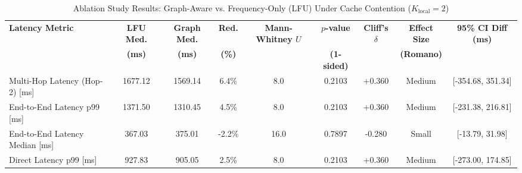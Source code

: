 \begin{table}[t]
\centering
\small
\caption{Ablation Study Results: Graph-Aware vs. Frequency-Only (LFU) Under Cache Contention ($K_{\text{local}} = 2$)}
\label{tab:ablation-graph-vs-lfu}
\begin{tabular}{lcccccccc}
\hline
\textbf{Latency Metric} & \textbf{LFU Med.} & \textbf{Graph Med.} & \textbf{Red.} & \textbf{Mann-Whitney $U$} & \textbf{$p$-value} & \textbf{Cliff's $\delta$} & \textbf{Effect Size} & \textbf{95\% CI Diff (ms)} \\
 & \textbf{(ms)} & \textbf{(ms)} & \textbf{(\%)} & & \textbf{(1-sided)} & & \textbf{(Romano)} & \\
\hline
Multi-Hop Latency (Hop-2) [ms] & 1677.12 & 1569.14 & 6.4\% & 8.0 & 0.2103 & +0.360 & Medium & [-354.68, 351.34] \\
End-to-End Latency p99 [ms] & 1371.50 & 1310.45 & 4.5\% & 8.0 & 0.2103 & +0.360 & Medium & [-231.38, 216.81] \\
End-to-End Latency Median [ms] & 367.03 & 375.01 & -2.2\% & 16.0 & 0.7897 & -0.280 & Small & [-13.79, 31.98] \\
Direct Latency p99 [ms] & 927.83 & 905.05 & 2.5\% & 8.0 & 0.2103 & +0.360 & Medium & [-273.00, 174.85] \\
\hline
\end{tabular}
\end{table}